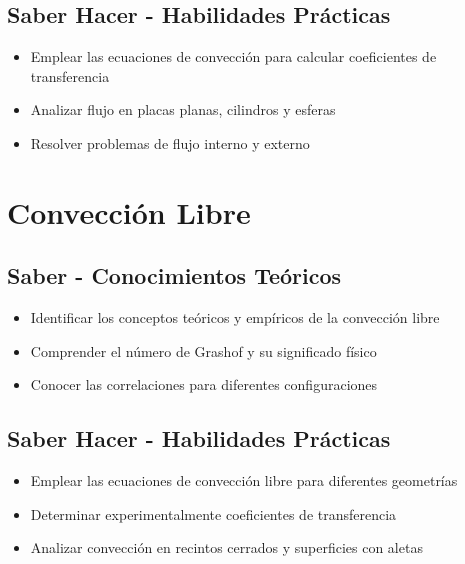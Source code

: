 \documentclass[12pt,a4paper,twoside]{book}
\begin{document}
	\subsection{Saber Hacer - Habilidades Prácticas}
	\begin{hacerbox}
		\begin{itemize}
			\item Emplear las ecuaciones de convección para calcular coeficientes de transferencia
			\item Analizar flujo en placas planas, cilindros y esferas
			\item Resolver problemas de flujo interno y externo
		\end{itemize}
	\end{hacerbox}
	
	\section{Convección Libre}
	\label{sec:conveccion_libre}
	
	\subsection{Saber - Conocimientos Teóricos}
	\begin{saberbox}
		\begin{itemize}
			\item Identificar los conceptos teóricos y empíricos de la convección libre
			\item Comprender el número de Grashof y su significado físico
			\item Conocer las correlaciones para diferentes configuraciones
		\end{itemize}
	\end{saberbox}
	
	\subsection{Saber Hacer - Habilidades Prácticas}
	\begin{hacerbox}
		\begin{itemize}
			\item Emplear las ecuaciones de convección libre para diferentes geometrías
			\item Determinar experimentalmente coeficientes de transferencia
			\item Analizar convección en recintos cerrados y superficies con aletas
		\end{itemize}
	\end{hacerbox}
	
\end{document}
